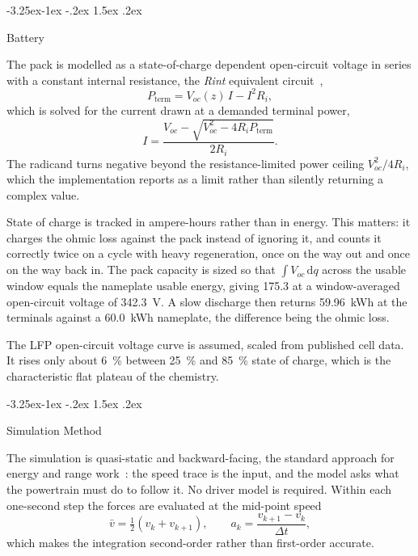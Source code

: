 \documentclass[twocolumn]{article}
\makeatletter
\newcommand{\asm}[1]{\textcolor{assumed}{#1}}
\renewcommand\subsection{\@startsection{subsection}{2}{\z@}%
  {-3.25ex\@plus -1ex \@minus -.2ex}%
  {1.5ex \@plus .2ex}%
  {\raggedright\normalfont\large\bfseries}}
\makeatother
\begin{document}
\subsection{Battery}

The pack is modelled as a state-of-charge dependent open-circuit voltage in
series with a constant internal resistance, the \emph{Rint} equivalent
circuit~\cite{he2011,plett2004},
\begin{equation}
P_{\mathrm{term}} = V_{oc}(z)\, I - I^2 R_i ,
\end{equation}
which is solved for the current drawn at a demanded terminal power,
\begin{equation}
I = \frac{V_{oc} - \sqrt{V_{oc}^2 - 4 R_i P_{\mathrm{term}}}}{2 R_i} .
\label{eq:current}
\end{equation}
The radicand turns negative beyond the resistance-limited power ceiling
$V_{oc}^2 / 4R_i$, which the implementation reports as a limit rather than
silently returning a complex value.

State of charge is tracked in ampere-hours rather than in energy. This matters:
it charges the ohmic loss against the pack instead of ignoring it, and counts
it correctly twice on a cycle with heavy regeneration, once on the way out and
once on the way back in. The pack capacity is sized so that
$\int V_{oc}\,\mathrm{d}q$ across the usable window equals the nameplate usable
energy, giving \SI{175.3}{\Ah} at a window-averaged open-circuit
voltage of \SI{342.3}{\volt}. A slow discharge then returns
\SI{59.96}{\kWh} at the terminals against a \SI{60.0}{\kWh}
nameplate, the difference being the ohmic loss.

The LFP open-circuit voltage curve is \asm{assumed}, scaled from published cell
data. It rises only about \SI{6}{\percent} between \SI{25}{\percent} and
\SI{85}{\percent} state of charge, which is the characteristic flat plateau of
the chemistry.

\subsection{Simulation Method}

The simulation is quasi-static and backward-facing, the standard approach for
energy and range work~\cite{guzzella2013}: the speed trace is the input, and
the model asks what the powertrain must do to follow it. No driver model is
required. Within each one-second step the forces are evaluated at the mid-point
speed
\begin{equation}
\bar v = \tfrac{1}{2}\left(v_k + v_{k+1}\right),
\qquad
a_k = \frac{v_{k+1} - v_k}{\Delta t},
\end{equation}
which makes the integration second-order rather than first-order accurate.
\end{document}
